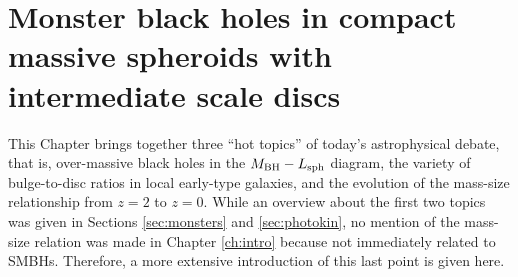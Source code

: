 \chapter{Monster black holes in compact massive spheroids with intermediate scale discs}
\label{ch:ellic}

This Chapter brings together three ``hot topics'' of today's astrophysical debate, 
that is, over-massive black holes in the $M_{\rm BH} - L_{\rm sph}$ diagram, 
the variety of bulge-to-disc ratios in local early-type galaxies, 
and the evolution of the mass-size relationship from $z=2$ to $z=0$. 
While an overview about the first two topics was given in Sections \ref{sec:monsters} and \ref{sec:photokin}, 
no mention of the mass-size relation was made in Chapter \ref{ch:intro} 
because not immediately related to SMBHs. 
Therefore, a more extensive introduction of this last point is given here. \\ 

